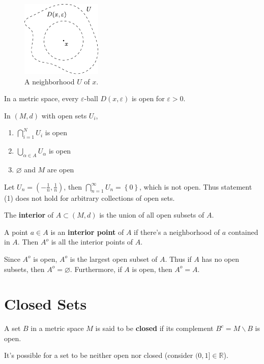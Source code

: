 \documentclass[10pt]{report}
\begin{document}
\begin{figure}[H]
	\centering
	\includegraphics[scale=2]{fig/neighborhood.pdf}
	\caption{A neighborhood $U$ of $x$.}
\end{figure}

\begin{prop}
	In a metric space, every $\varepsilon$-ball $D(x,\varepsilon)$ is open for $\varepsilon>0$.
\end{prop}

\begin{prop}
	In $(M,d)$ with open sets $U_i$,
	\begin{enumerate}
		\item $\bigcap_{i=1}^N U_i$ is open
		\item $\bigcup_{\alpha \in A} U_\alpha$ is open
		\item $\varnothing$ and $M$ are open
	\end{enumerate}
\end{prop}

\begin{ex}[]
	Let $U_n = \left( -\frac{1}{n}, \frac{1}{n} \right)$, then $\bigcap_{n=1}^\infty U_n = \left\{ 0 \right\}$, which is not open. Thus statement (1) does not hold for arbitrary collections of open sets.
\end{ex}

\begin{defn}[]
	The \textbf{interior} of $A \subset (M,d)$ is the union of all open subsets of $A$.
\end{defn}

A point $a \in A$ is an \textbf{interior point} of $A$ if there's a neighborhood of $a$ contained in $A$. Then $A^{o}$ is all the interior points of $A$.

Since $A^o$ is open, $A^o$ is the largest open subset of $A$. Thus if $A$ has no open subsets, then $A^o=\varnothing$. Furthermore, if $A$ is open, then $A^o=A$.



\section{Closed Sets}
\begin{defn}[]
	A set $B$ in a metric space $M$ is said to be \textbf{closed} if its complement $B^c = M\backslash B$ is open.
\end{defn}
It's possible for a set to be neither open nor closed (consider $(0,1] \in \mathbb{R}$).
\end{document}

